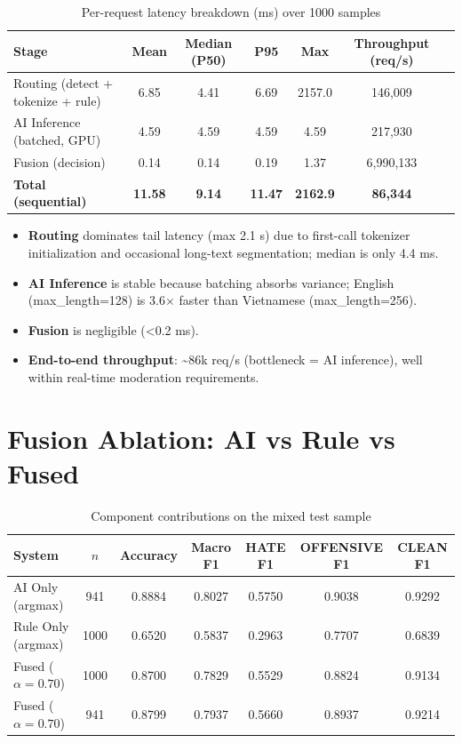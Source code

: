 \documentclass[11pt,a4paper]{article}
\begin{document}
\begin{table}[H]
\centering
\caption{Per-request latency breakdown (ms) over 1000 samples}
\label{tab:latency}
\begin{tabular}{lcccccc}
\toprule
Stage & Mean & Median (P50) & P95 & Max & Throughput (req/s) \\
\midrule
Routing (detect + tokenize + rule) & 6.85 & 4.41 & 6.69 & 2157.0 & 146,009 \\
AI Inference (batched, GPU)        & 4.59 & 4.59 & 4.59 & 4.59   & 217,930 \\
Fusion (decision)                  & 0.14 & 0.14 & 0.19 & 1.37   & 6,990,133 \\
\midrule
\textbf{Total (sequential)}        & \textbf{11.58} & \textbf{9.14} & \textbf{11.47} & \textbf{2162.9} & \textbf{86,344} \\
\bottomrule
\end{tabular}
\end{table}

\begin{itemize}
    \item \textbf{Routing} dominates tail latency (max 2.1 s) due to first-call tokenizer initialization and occasional long-text segmentation; median is only 4.4 ms.
    \item \textbf{AI Inference} is stable because batching absorbs variance; English (max\_length=128) is 3.6$\times$ faster than Vietnamese (max\_length=256).
    \item \textbf{Fusion} is negligible (<0.2 ms).
    \item \textbf{End-to-end throughput}: \textasciitilde 86k req/s (bottleneck = AI inference), well within real-time moderation requirements.
\end{itemize}

\section{Fusion Ablation: AI vs Rule vs Fused}
\label{sec:ablation}

\begin{table}[H]
\centering
\caption{Component contributions on the mixed test sample}
\label{tab:ablation}
\begin{tabular}{lcccccc}
\toprule
System & $n$ & Accuracy & Macro F1 & HATE F1 & OFFENSIVE F1 & CLEAN F1 \\
\midrule
AI Only (argmax)        & 941  & 0.8884 & 0.8027 & 0.5750 & 0.9038 & 0.9292 \\
Rule Only (argmax)      & 1000 & 0.6520 & 0.5837 & 0.2963 & 0.7707 & 0.6839 \\
Fused ($\alpha=0.70$)   & 1000 & 0.8700 & 0.7829 & 0.5529 & 0.8824 & 0.9134 \\
Fused ($\alpha=0.70$)   & 941  & 0.8799 & 0.7937 & 0.5660 & 0.8937 & 0.9214 \\
\bottomrule
\end{tabular}
\end{table}
\end{document}
